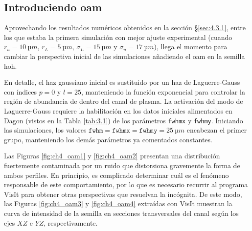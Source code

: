 \subsection{Introduciendo \acrshort{oam}}\label{sec:4.3.3}
Aprovechando los resultados numéricos obtenidos en la sección \S\ref{sec:4.3.1}, entre los que estaba la primera simulación con mejor ajuste experimental (cuando $r_{u}=\qty{10}{µm}$, $r_{L}=\qty{5}{µm}$, $\sigma_{L}=\qty{15}{µm}$ y $\sigma_{u}=\qty{17}{µm}$), llega el momento para cambiar la perspectiva inicial de las simulaciones añadiendo el \acrshort{oam} en la semilla \acrshort{hoh}.

En detalle, el haz gaussiano inicial es sustituido por un haz de Laguerre-Gauss con índices $p=0$ y $l=25$, manteniendo la función exponencial para controlar la región de abundancia de  dentro del canal de plasma. La activación del modo de Laguerre-Gauss requiere la habilitación en los datos iniciales alimentados en Dagon (vistos en la Tabla \ref{tab:3.1}) de los parámetros \texttt{fwhmx} y \texttt{fwhmy}. Iniciando las simulaciones, los valores $\texttt{fwhm}=\texttt{fwhmx}=\texttt{fwhmy}=\qty{25}{µm}$ encabezan el primer grupo, manteniendo los demás parámetros ya comentados constantes.

Las Figuras \ref{fig:ch4_oam1} y \ref{fig:ch4_oam2} presentan una distribución fuertemente contaminada por un ruido que distorsiona gravemente la forma de ambos perfiles. En principio, es complicado determinar cuál es el fenómeno responsable de este comportamiento, por lo que es necesario recurrir al programa VisIt para obtener otras perspectivas que resuelvan la incógnita. De este modo, las Figuras \ref{fig:ch4_oam3} y \ref{fig:ch4_oam4} extraídas con VisIt muestran la curva de intensidad de la semilla en secciones transversales del canal según los ejes $XZ$ e $YZ$, respectivamente.

